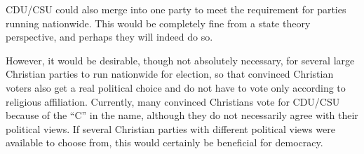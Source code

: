 CDU/CSU could also merge into one party to meet the requirement for
parties running nationwide. This would be completely fine from a state theory perspective, and perhaps
they will indeed do so.

However, it would be desirable, though not absolutely necessary, for several large
Christian parties to run nationwide for election, so that convinced Christian voters also get a
real political choice and do not have to vote only according to religious affiliation. Currently,
many convinced Christians vote for CDU/CSU because of the \enquote{C} in the name, although they do not
necessarily agree with their political views. If several Christian parties with
different political views were available to choose from, this would certainly be beneficial for
democracy.

